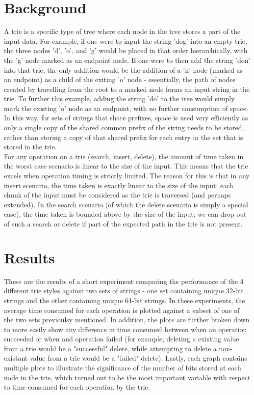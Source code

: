 \documentclass{llncs}
\begin{document}
\section{Background}
A trie is a specific type of tree where each node in the tree stores a part of the input data. For example, if one were to input the string 'dog' into an empty trie, the three nodes 'd', 'o', and 'g' would be placed in that order hierarchically, with the 'g' node marked as an endpoint node. If one were to then add the string 'don' into that trie, the only addition would be the addition of a 'n' node (marked as an endpoint) as a child of the exiting 'o' node - essentially, the path of nodes created by travelling from the root to a marked node forms an input string in the trie. To further this example, adding the string 'do' to the tree would simply mark the existing 'o' node as an endpoint, with no further consumption of space. In this way, for sets of strings that share prefixes, space is used very efficiently as only a single copy of the shared common prefix of the string needs to be stored, rather than storing a copy of that shared prefix for each entry in the set that is stored in the trie. \\ %
For any operation on a trie (search, insert, delete), the amount of time taken in the worst case scenario is linear to the size of the input. This means that the trie excels when operation timing is strictly limited. The reason for this is that in any insert scenario, the time taken is exactly linear to the size of the input: each chunk of the input must be considered as the trie is traversed (and perhaps extended). In the search scenario (of which the delete scenario is simply a special case), the time taken is bounded above by the size of the input; we can drop out of such a search or delete if part of the expected path in the trie is not present. \\
\newpage
\section{Results}
These are the results of a short experiment comparing the performance of the 4 different trie styles against two sets of strings - one set containing unique 32-bit strings and the other containing unique 64-bit strings. In these experiments, the average time consumed for each operation is plotted against a subset of one of the two sets previoulsy mentioned. In addition, the plots are further broken down to more easily show any difference in time consumed between when an operation succeeded or when and operation failed (for example, deleting a existing value from a trie would be a "successful" delete, while attempting to delete a non-existant value from a trie would be a "failed" delete). Lastly, each graph contains multiple plots to illustrate the significance of the number of bits stored at each node in the trie, which turned out to be the most important variable with respect to time consumed for each operation by the trie. \\
\end{document}
